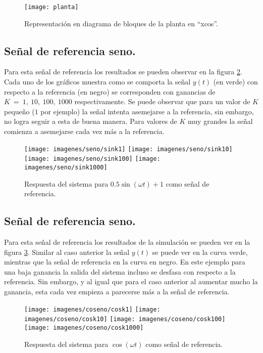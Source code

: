 \documentclass[11pt,a4paper]{article}
\begin{document}
\begin{figure}[!ht]
\centering
\texttt{[image: planta]}
\caption{Representación en diagrama de bloques de la planta en ``xcos''.}
\label{fig:planta}
\end{figure}

\subsection{Señal de referencia seno.}

Para esta señal de referencia los resultados se pueden observar en la figura \ref{fig:sin}. Cada uno de los gráficos muestra como se comporta la señal $y(t)$ (en verde) con respecto a la referencia (en negro) se corresponden con ganancias de $K~=~1,~10,~100,~1000$ respectivamente. Se puede observar que para un valor de $K$ pequeño ($1$ por ejemplo) la señal intenta asemejarse a la referencia, sin embargo, no logra seguir a esta de buena manera. Para valores de $K$ muy grandes la señal comienza a asemejarse cada vez más a la referencia.

\begin{figure}[!ht]
\centering
\texttt{[image: imagenes/seno/sink1]}
\texttt{[image: imagenes/seno/sink10]}
\texttt{[image: imagenes/seno/sink100]}
\texttt{[image: imagenes/seno/sink1000]}
\caption{Respuesta del sistema para $0.5\sin(\omega t) + 1$ como señal de referencia.}
\label{fig:sin}
\end{figure}

\subsection{Señal de referencia seno.}

Para esta señal de referencia los resultados de la simulación se pueden ver en la figura \ref{fig:cos}. Similar al caso anterior la señal $y(t)$ se puede ver en la curva verde, mientras que la señal de referencia en la curva en negro. En este ejemplo para una baja ganancia la salida del sistema incluso se desfasa con respecto a la referencia. Sin embargo, y al igual que para el caso anterior al aumentar mucho la ganancia, esta cada vez empieza a parecerse más a la señal de referencia.

\begin{figure}[!ht]
\centering
\texttt{[image: imagenes/coseno/cosk1]}
\texttt{[image: imagenes/coseno/cosk10]}
\texttt{[image: imagenes/coseno/cosk100]}
\texttt{[image: imagenes/coseno/cosk1000]}
\caption{Respuesta del sistema para $\cos(\omega t)$ como señal de referencia.}
\label{fig:cos}
\end{figure}
\end{document}
